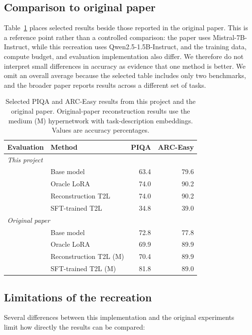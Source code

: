 \documentclass{article}
\begin{document}
\subsection{Comparison to original paper}

Table~\ref{tab:paper-comparison} places selected results beside those reported in the original paper. This is a reference point rather than a controlled comparison: the paper uses Mistral-7B-Instruct, while this recreation uses Qwen2.5-1.5B-Instruct, and the training data, compute budget, and evaluation implementation also differ. We therefore do not interpret small differences in accuracy as evidence that one method is better. We omit an overall average because the selected table includes only two benchmarks, and the broader paper reports results across a different set of tasks.

\begin{table}[t]
\centering
\caption{Selected PIQA and ARC-Easy results from this project and the original paper. Original-paper reconstruction results use the medium (M) hypernetwork with task-description embeddings. Values are accuracy percentages.}
\label{tab:paper-comparison}
\begin{tabular}{llrr}
\toprule
Evaluation & Method & PIQA & ARC-Easy \\
\midrule
\multicolumn{4}{l}{\textit{This project}} \\
& Base model & 63.4 & 79.6 \\
& Oracle LoRA & 74.0 & 90.2 \\
& Reconstruction T2L & 74.0 & 90.2 \\
& SFT-trained T2L & 34.8 & 39.0 \\
\midrule
\multicolumn{4}{l}{\textit{Original paper}} \\
& Base model & 72.8 & 77.8 \\
& Oracle LoRA & 69.9 & 89.9 \\
& Reconstruction T2L (M) & 70.4 & 89.9 \\
& SFT-trained T2L (M) & 81.8 & 89.0 \\
\bottomrule
\end{tabular}
\end{table}

\subsection{Limitations of the recreation}

Several differences between this implementation and the original experiments limit how directly the results can be compared:
\end{document}
